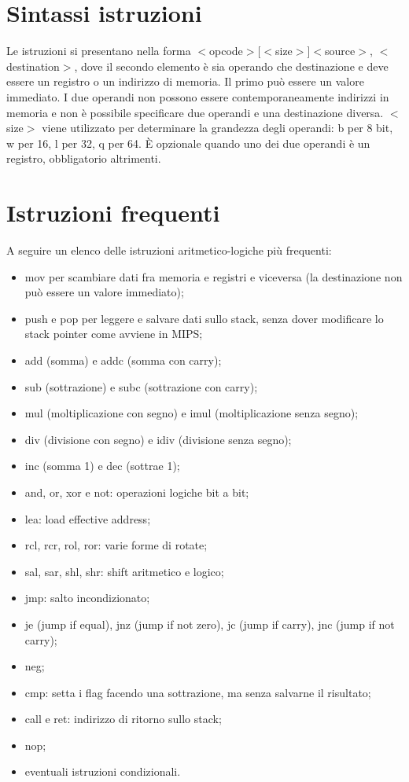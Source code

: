 \section{Sintassi istruzioni}
Le istruzioni si presentano nella forma $<$opcode$>$[$<$size$>$]$<$source$>$, $<$destination$>$, dove il secondo elemento \`e sia operando che destinazione e deve essere
un registro o un indirizzo di memoria. Il primo pu\`o essere un valore immediato. I due operandi non possono essere contemporaneamente indirizzi in memoria e non \`e
possibile specificare due operandi e una destinazione diversa. $<$size$>$ viene utilizzato per determinare la grandezza degli operandi: b per 8 bit, w per 16, l per 32,  
q per 64. \`E opzionale quando uno dei due operandi \`e un registro, obbligatorio altrimenti. 
\section{Istruzioni frequenti}
A seguire un elenco delle istruzioni aritmetico-logiche più frequenti:
\begin{itemize}
\item mov per scambiare dati fra memoria e registri e viceversa (la destinazione non può essere un valore immediato);
\item push e pop per leggere e salvare dati sullo stack, senza dover modificare lo stack pointer come avviene in MIPS;
\item add (somma) e addc (somma con carry);
\item sub (sottrazione) e subc (sottrazione con carry);
\item mul (moltiplicazione con segno) e imul (moltiplicazione senza segno);
\item div (divisione con segno) e idiv (divisione senza segno);
\item inc (somma 1) e dec (sottrae 1);
\item and, or, xor e not: operazioni logiche bit a bit;
\item lea: load effective address;
\item rcl, rcr, rol, ror: varie forme di rotate;
\item sal, sar, shl, shr: shift aritmetico e logico;
\item jmp: salto incondizionato;
\item je (jump if equal), jnz (jump if not zero), jc (jump if carry), jnc (jump if not carry);
\item neg;
\item cmp: setta i flag facendo una sottrazione, ma senza salvarne il risultato;
\item call e ret: indirizzo di ritorno sullo stack;
\item nop;
\item eventuali istruzioni condizionali.
\end{itemize}
